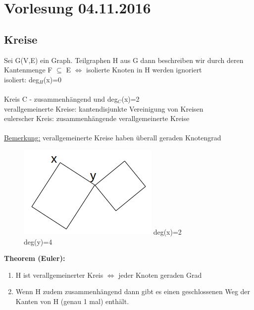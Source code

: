 \section{Vorlesung 04.11.2016}
\subsection{Kreise}
Sei G(V,E) ein Graph. Teilgraphen H aus G dann beschreiben wir durch deren Kantenmenge F $\subseteq$ E $\Leftrightarrow$ isolierte Knoten in H werden ignoriert\\
isoliert: deg$_H$(x)=0
\\\\
Kreis C - zusammenhängend und deg$_C$(x)=2\\
verallgemeinerte Kreise: kantendisjunkte Vereinigung von Kreisen\\
eulerscher Kreis: zusammenhängende verallgemeinerte Kreise\\
\\
\underline{Bemerkung:} verallgemeinerte Kreise haben überall geraden Knotengrad
\begin{figure}[htp]
\centering
\includegraphics[scale=0.75]{lectures/161104/pix/pic1.jpg}
deg(x)=2\\
deg(y)=4
\end{figure}

\textbf{Theorem (Euler):}
\begin{enumerate}
	\item H ist verallgemeinerter Kreis $\Leftrightarrow$ jeder Knoten geraden Grad
	\item Wenn H zudem zusammenhängend dann gibt es einen geschlossenen Weg der Kanten von H (genau 1 mal) enthält.
\end{enumerate}

